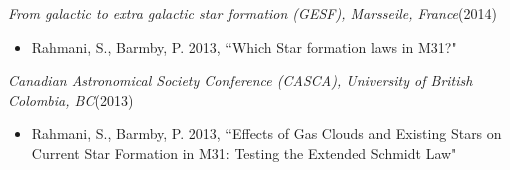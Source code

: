 \documentclass[12pt,twoside]{report}
\numberwithin{figure}{chapter}
\begin{document}
{\sl From galactic to extra galactic star formation (GESF), Marsseile, France}\hfill (2014)
\begin{itemize} 
\item Rahmani, S., Barmby, P. 2013, ``Which Star formation laws in M31?" 
\end{itemize}

{\sl Canadian Astronomical Society Conference (CASCA), University of British Colombia, BC}\hfill (2013)
\begin{itemize} 
\item Rahmani, S., Barmby, P. 2013, ``Effects of Gas Clouds and Existing Stars on Current Star Formation in M31: Testing the Extended Schmidt Law" 
\end{itemize}
\end{document}
